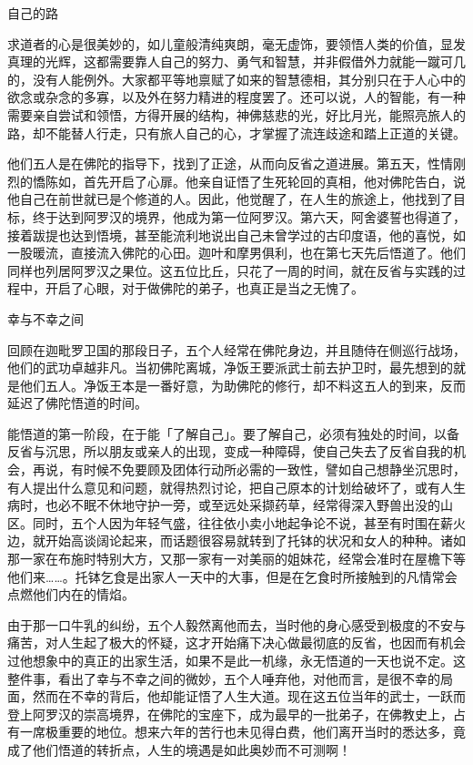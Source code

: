 \documentclass[12pt,twoside,openany]{book}
\begin{document}
自己的路

求道者的心是很美妙的，如儿童般清纯爽朗，毫无虚饰，要领悟人类的价值，显发真理的光辉，这都需要靠人自己的努力、勇气和智慧，并非假借外力就能一蹴可几的，没有人能例外。大家都平等地禀赋了如来的智慧德相，其分别只在于人心中的欲念或杂念的多寡，以及外在努力精进的程度罢了。还可以说，人的智能，有一种需要亲自尝试和领悟，方得开展的结构，神佛慈悲的光，好比月光，能照亮旅人的路，却不能替人行走，只有旅人自己的心，才掌握了流连歧途和踏上正道的关键。

他们五人是在佛陀的指导下，找到了正途，从而向反省之道进展。第五天，性情刚烈的憍陈如，首先开启了心扉。他亲自证悟了生死轮回的真相，他对佛陀告白，说他自己在前世就已是个修道的人。因此，他觉醒了，在人生的旅途上，他找到了目标，终于达到阿罗汉的境界，他成为第一位阿罗汉。第六天，阿舍婆誓也得道了，接着跋提也达到悟境，甚至能流利地说出自己未曾学过的古印度语，他的喜悦，如一股暖流，直接流入佛陀的心田。迦叶和摩男俱利，也在第七天先后悟道了。他们同样也列居阿罗汉之果位。这五位比丘，只花了一周的时间，就在反省与实践的过程中，开启了心眼，对于做佛陀的弟子，也真正是当之无愧了。

幸与不幸之间

回顾在迦毗罗卫国的那段日子，五个人经常在佛陀身边，并且随侍在侧巡行战场，他们的武功卓越非凡。当初佛陀离城，净饭王要派武士前去护卫时，最先想到的就是他们五人。净饭王本是一番好意，为助佛陀的修行，却不料这五人的到来，反而延迟了佛陀悟道的时间。

能悟道的第一阶段，在于能「了解自己」。要了解自己，必须有独处的时间，以备反省与沉思，所以朋友或亲人的出现，变成一种障碍，使自己失去了反省自我的机会，再说，有时候不免要顾及团体行动所必需的一致性，譬如自己想静坐沉思时，有人提出什么意见和问题，就得热烈讨论，把自己原本的计划给破坏了，或有人生病时，也必不眠不休地守护一旁，或至远处采撷药草，经常得深入野兽出没的山区。同时，五个人因为年轻气盛，往往依小卖小地起争论不说，甚至有时围在薪火边，就开始高谈阔论起来，而话题很容易就转到了托钵的状况和女人的种种。诸如那一家在布施时特别大方，又那一家有一对美丽的姐妹花，经常会准时在屋檐下等他们来……。托钵乞食是出家人一天中的大事，但是在乞食时所接触到的凡情常会点燃他们内在的情焰。

由于那一口牛乳的纠纷，五个人毅然离他而去，当时他的身心感受到极度的不安与痛苦，对人生起了极大的怀疑，这才开始痛下决心做最彻底的反省，也因而有机会过他想象中的真正的出家生活，如果不是此一机缘，永无悟道的一天也说不定。这整件事，看出了幸与不幸之间的微妙，五个人唾弃他，对他而言，是很不幸的局面，然而在不幸的背后，他却能证悟了人生大道。现在这五位当年的武士，一跃而登上阿罗汉的崇高境界，在佛陀的宝座下，成为最早的一批弟子，在佛教史上，占有一席极重要的地位。想来六年的苦行也未见得白费，他们离开当时的悉达多，竟成了他们悟道的转折点，人生的境遇是如此奥妙而不可测啊！
\end{document}
